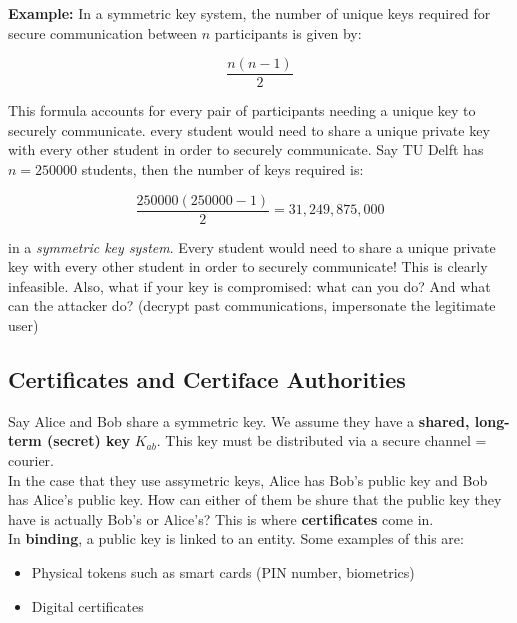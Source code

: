\textbf{Example:} In a symmetric key system, the number of unique keys required for secure communication
between $n$ participants is given by:

\[ \frac{n(n-1)}{2}\]

This formula accounts for every pair of participants needing a unique key to securely communicate.
 every student would need to share a unique private key with every other student in order to securely communicate.
Say TU Delft has $n=250000$ students, then the number of keys required is:

\[ \frac{250000(250000-1)}{2} = 31,249,875,000 \]

in a \emph{symmetric key system}. Every student would need to share a unique private key with every other student in order to securely communicate! This is clearly infeasible.
Also, what if your key is compromised: what can you do? And what can the attacker do? (decrypt past communications, impersonate the legitimate user)

\subsection{Certificates and Certiface Authorities}
Say Alice and Bob share a symmetric key. We assume they have a \textbf{shared, long-term (secret) key} $K_{ab}$.
This key must be distributed via a secure channel = courier. \\

In the case that they use assymetric keys, Alice has Bob's public key and Bob has Alice's public key.
How can either of them be shure that the public key they have is actually Bob's or Alice's?
This is where \textbf{certificates} come in. \\

In \textbf{binding}, a public key is linked to an entity. Some examples of this are:
\begin{itemize}
    \item Physical tokens such as smart cards (PIN number, biometrics)
    \item Digital certificates
\end{itemize}

